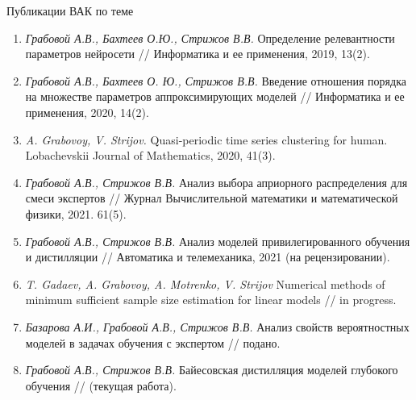 \documentclass[10pt,pdf,hyperref={unicode}]{beamer}
\begin{document}
\begin{frame}{Публикации ВАК по теме}
\justifying
\begin{enumerate}
\item \textit{Грабовой А.В., Бахтеев О.Ю., Стрижов В.В.} Определение релевантности параметров нейросети // Информатика и ее применения, 2019, 13(2).
\item \textit{Грабовой А.В., Бахтеев О. Ю., Стрижов В.В.} Введение отношения порядка на множестве параметров аппроксимирующих моделей // Информатика и ее применения, 2020, 14(2).
\item \textit{A. Grabovoy, V. Strijov.} Quasi-periodic time series clustering for human. Lobachevskii Journal of Mathematics, 2020, 41(3).
\item \textit{Грабовой А.В., Стрижов В.В.} Анализ выбора априорного распределения для смеси экспертов // Журнал Вычислительной математики и математической физики, 2021. 61(5).
\item \textit{Грабовой А.В., Стрижов В.В.} Анализ моделей привилегированного обучения и дистилляции // Автоматика и телемеханика, 2021 (на рецензировании).
\item \textit{T. Gadaev, A. Grabovoy, A. Motrenko, V. Strijov} Numerical methods of minimum sufficient sample size estimation for linear models // in progress.
\item \textit{Базарова А.И., Грабовой А.В., Стрижов В.В.} Анализ свойств вероятностных моделей в задачах обучения с экспертом // подано.
\item \textit{Грабовой А.В., Стрижов В.В.} Байесовская дистилляция моделей глубокого обучения // (текущая работа).

\end{enumerate}

\end{frame}
\end{document}

